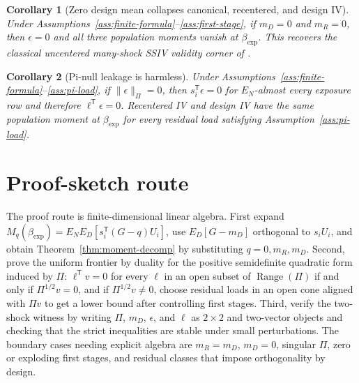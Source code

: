\documentclass[11pt]{article}
\newcommand{\transpose}{\mathsf{T}}
\theoremstyle{definition}
\theoremstyle{plain}
\newtheorem{corollary}{Corollary}
\theoremstyle{remark}
\begin{document}
\begin{corollary}[Zero design mean collapses canonical, recentered, and design IV]\label{cor:zero-mean}
Under Assumptions~\ref{ass:finite-formula}--\ref{ass:first-stage}, if \(m_D=0\) and \(m_R=0\), then \(\epsilon=0\) and all three population moments vanish at \(\beta_{\exp}\).  This recovers the classical uncentered many-shock SSIV validity corner of \citet{BorusyakHullJaravel2022REStud}.
\end{corollary}

\begin{corollary}[Pi-null leakage is harmless]\label{cor:pi-null}
Under Assumptions~\ref{ass:finite-formula}--\ref{ass:pi-load}, if \(\|\epsilon\|_\Pi=0\), then \(s_i^\transpose\epsilon=0\) for \(E_N\)-almost every exposure row and therefore \(\ell^\transpose\epsilon=0\).  Recentered IV and design IV have the same population moment at \(\beta_{\exp}\) for every residual load satisfying Assumption~\ref{ass:pi-load}.
\end{corollary}

\section{Proof-sketch route}
The proof route is finite-dimensional linear algebra.  First expand \(M_q(\beta_{\exp})=E_NE_D[s_i^\transpose(G-q)U_i]\), use \(E_D[G-m_D]\) orthogonal to \(s_iU_i\), and obtain Theorem~\ref{thm:moment-decomp} by substituting \(q=0,m_R,m_D\).  Second, prove the uniform frontier by duality for the positive semidefinite quadratic form induced by \(\Pi\): \(\ell^\transpose v=0\) for every \(\ell\) in an open subset of \(\operatorname{Range}(\Pi)\) if and only if \(\Pi^{1/2}v=0\), and if \(\Pi^{1/2}v\ne0\), choose residual loads in an open cone aligned with \(\Pi v\) to get a lower bound after controlling first stages.  Third, verify the two-shock witness by writing \(\Pi\), \(m_D\), \(\epsilon\), and \(\ell\) as \(2\times2\) and two-vector objects and checking that the strict inequalities are stable under small perturbations.  The boundary cases needing explicit algebra are \(m_R=m_D\), \(m_D=0\), singular \(\Pi\), zero or exploding first stages, and residual classes that impose orthogonality by design.
\end{document}
